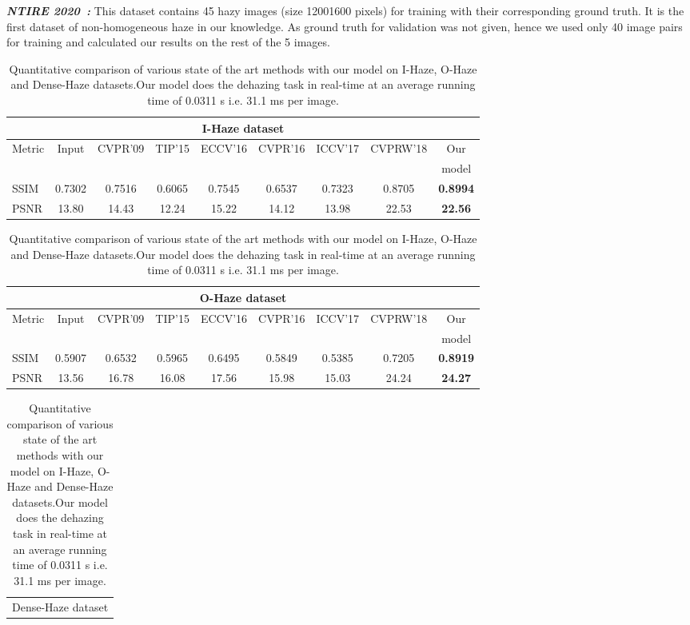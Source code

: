 \documentclass[runningheads]{llncs}
\begin{document}
\textbf{\textit{NTIRE 2020~\cite{NTIRE2020}:}} This dataset contains 45 hazy images (size 12001600 pixels) for training with their corresponding ground truth. It is the first dataset of non-homogeneous haze in our knowledge. As ground truth for validation was not given, hence we used only 40 image pairs for training and calculated our results on the rest of the 5 images.

\begin{table}[t]
\centering
\caption{Quantitative comparison of various state of the art methods with our model on I-Haze, O-Haze and Dense-Haze datasets.Our model does the dehazing task in real-time at an average running time of 0.0311 s i.e. 31.1 ms per image.}
\label{tbl:indoor_outdoor_table}
\begin{tabular}{|l||c|c|c|c|c|c|c|c|}
    \hline
    \multicolumn{9}{|c|}{I-Haze dataset}\\
    \hline
    Metric & Input & CVPR'09 & TIP'15 & ECCV'16 & CVPR'16 & ICCV'17 & CVPRW'18 & Our\\
    & & \cite{he2010single}& \cite{zhu2015fast}& \cite{ren2016single}& \cite{berman2016non}& \cite{li2017all}& \cite{zhang2018multi}& model\\
    \hline
    SSIM  & 0.7302 & 0.7516 & 0.6065 & 0.7545 & 0.6537 & 0.7323 & 0.8705 & \textbf{0.8994}\\
    \hline
    PSNR & 13.80 & 14.43 & 12.24 & 15.22 & 14.12 & 13.98 & 22.53 & \textbf{22.56}\\
    \hline
\end{tabular}
\begin{tabular}{|l||c|c|c|c|c|c|c|c|}
    \hline
    \multicolumn{9}{|c|}{O-Haze dataset}\\
    \hline
    Metric & Input & CVPR'09 & TIP'15 & ECCV'16 & CVPR'16 & ICCV'17 & CVPRW'18 & Our\\
    & & \cite{he2010single}& \cite{zhu2015fast}& \cite{ren2016single}& \cite{berman2016non}& \cite{li2017all}& \cite{zhang2018multi}& model\\
    \hline
    SSIM  & 0.5907 & 0.6532 & 0.5965 & 0.6495 & 0.5849 & 0.5385 & 0.7205 & \textbf{0.8919}\\
    \hline
    PSNR & 13.56 & 16.78 & 16.08 & 17.56 & 15.98 & 15.03 & 24.24 & \textbf{24.27}\\
    \hline
\end{tabular}
\begin{tabular}{|l||c|c|c|c|c|c|c|c|c|}
    \hline
    \multicolumn{10}{|c|}{Dense-Haze dataset}\\

\end{tabular}
\end{table}
\end{document}
